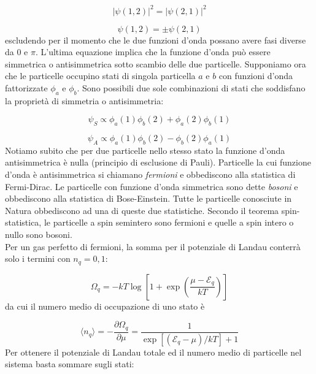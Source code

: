 \documentclass[a4paper]{report}
\begin{document}
\begin{equation}
    |\psi(1,2)|^2 = |\psi(2,1)|^2
\end{equation}

\begin{equation}
    \psi(1,2) = \pm \psi(2,1)
\end{equation}
escludendo per il momento che le due funzioni d'onda possano avere fasi diverse da $0$ e $\pi$. L'ultima equazione implica che la funzione d'onda può essere simmetrica o antisimmetrica sotto scambio delle due particelle. Supponiamo ora che le particelle occupino stati di singola particella $a$ e $b$ con funzioni d'onda fattorizzate $\phi_a$ e $\phi_b$. Sono possibili due sole combinazioni di stati che soddisfano la proprietà di simmetria o antisimmetria:

\begin{equation}
    \psi_S \propto \phi_a(1)\phi_b(2) + \phi_a(2)\phi_b(1)
\end{equation}

\begin{equation}
    \psi_A \propto \phi_a(1)\phi_b(2) - \phi_b(2)\phi_a(1)
\end{equation}
Notiamo subito che per due particelle nello stesso stato la funzione d'onda antisimmetrica è nulla (principio di esclusione di Pauli). Particelle la cui funzione d'onda è antisimmetrica si chiamano \textit{fermioni} e obbediscono alla statistica di Fermi-Dirac. Le particelle con funzione d'onda simmetrica sono dette \textit{bosoni} e obbediscono alla statistica di Bose-Einstein. Tutte le particelle conosciute in Natura obbediscono ad una di queste due statistiche. Secondo il teorema spin-statistica, le particelle a spin semintero sono fermioni e quelle a spin intero o nullo sono bosoni. \\
Per un gas perfetto di fermioni, la somma per il potenziale di Landau conterrà solo i termini con $n_q = 0,1$:

\begin{equation}
    \Omega_q = -k T \log \left[1+\exp\left(\frac{\mu-\mathcal{E}_q}{k T}\right)\right]
\end{equation}
da cui il numero medio di occupazione di uno stato è

\begin{equation}
        \langle n_q \rangle  = -\frac{\partial \Omega_q}{\partial \mu} 
         = \frac{1}{\exp[(\mathcal{E}_q-\mu)/k T]+1}
    \label{fermi-dirac}
\end{equation}
Per ottenere il potenziale di Landau totale ed il numero medio di particelle nel sistema basta sommare sugli stati:
\end{document}
